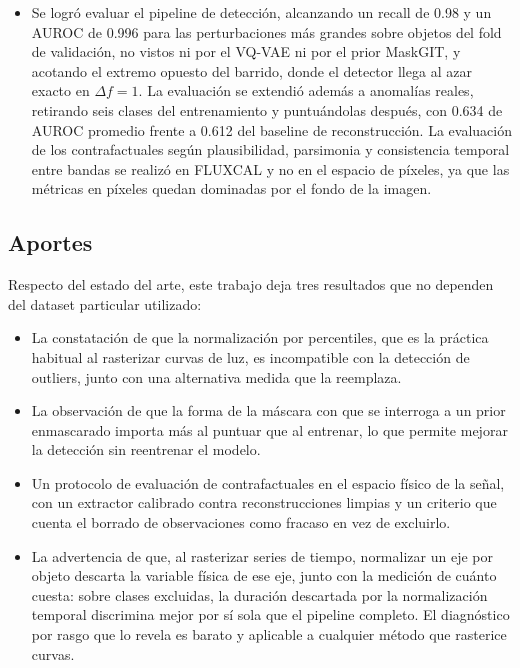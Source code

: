 \begin{itemize}
    \item Se logró evaluar el pipeline de detección, alcanzando un recall de 0.98 y un AUROC de 0.996 para las perturbaciones más grandes sobre objetos del fold de validación, no vistos ni por el VQ-VAE ni por el prior MaskGIT, y acotando el extremo opuesto del barrido, donde el detector llega al azar exacto en $\Delta f = 1$. La evaluación se extendió además a anomalías reales, retirando seis clases del entrenamiento y puntuándolas después, con 0.634 de AUROC promedio frente a 0.612 del baseline de reconstrucción. La evaluación de los contrafactuales según plausibilidad, parsimonia y consistencia temporal entre bandas se realizó en FLUXCAL y no en el espacio de píxeles, ya que las métricas en píxeles quedan dominadas por el fondo de la imagen.
\end{itemize}

\subsection{Aportes}

Respecto del estado del arte, este trabajo deja tres resultados que no dependen del dataset particular utilizado:

\begin{itemize}
    \item La constatación de que la normalización por percentiles, que es la práctica habitual al rasterizar curvas de luz, es incompatible con la detección de outliers, junto con una alternativa medida que la reemplaza.
    \item La observación de que la forma de la máscara con que se interroga a un prior enmascarado importa más al puntuar que al entrenar, lo que permite mejorar la detección sin reentrenar el modelo.
    \item Un protocolo de evaluación de contrafactuales en el espacio físico de la señal, con un extractor calibrado contra reconstrucciones limpias y un criterio que cuenta el borrado de observaciones como fracaso en vez de excluirlo.
    \item La advertencia de que, al rasterizar series de tiempo, normalizar un eje por objeto descarta la variable física de ese eje, junto con la medición de cuánto cuesta: sobre clases excluidas, la duración descartada por la normalización temporal discrimina mejor por sí sola que el pipeline completo. El diagnóstico por rasgo que lo revela es barato y aplicable a cualquier método que rasterice curvas.
\end{itemize}

